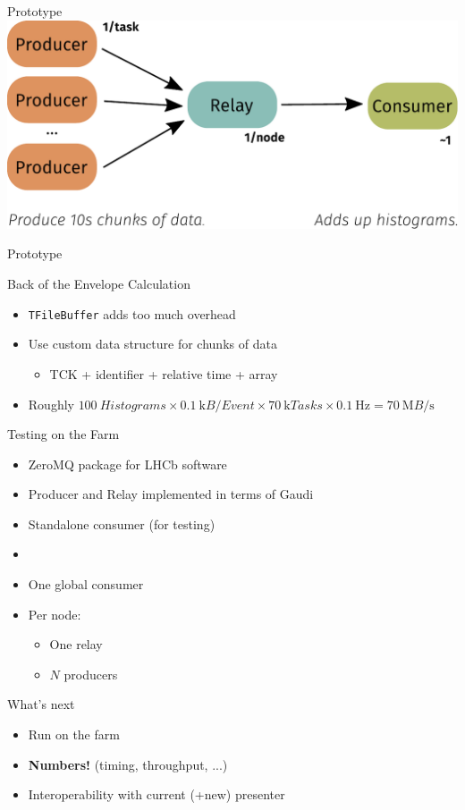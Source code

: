 \documentclass[aspectratio=1610,compress,titleprogressbar]{beamer}
\begin{document}
\begin{frame}{Prototype}
  \includegraphics[width=\textwidth]{graphics/flow.pdf}
\end{frame}

\begin{frame}{Prototype}
  \begin{block}{Back of the Envelope Calculation}
    \begin{itemize}
      \item \texttt{TFileBuffer} adds too much overhead
      \item Use custom data structure for chunks of data \begin{itemize}
        \item TCK + identifier + relative time + array
      \end{itemize}
      \item Roughly $\SI{100}{Histograms} \times \SI{0.1}{\kilo B\per Event} \times \SI{70}{\kilo Tasks} \times \SI{0.1}{\hertz} = \SI{70}{\mega B\per\second}$
    \end{itemize}
  \end{block}
\end{frame}

\begin{frame}{Testing on the Farm}
  \begin{itemize}
    \item ZeroMQ package for LHCb software
    \item Producer and Relay implemented in terms of Gaudi
    \item Standalone consumer (for testing)
    \item [] {}
    \item One global consumer
    \item Per node: \begin{itemize}
      \item One relay
      \item $N$ producers
    \end{itemize}
  \end{itemize}
\end{frame}

\begin{frame}{What's next}
  \begin{itemize}
    \item Run on the farm
    \item \textbf{Numbers!} (timing, throughput, ...)
    \item Interoperability with current (+new) presenter
  \end{itemize}
\end{frame}
\end{document}
